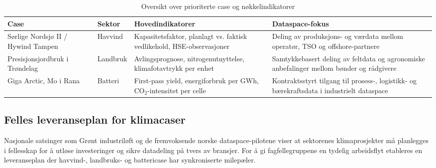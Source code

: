 \begin{table}[h]
    \centering
    \caption{Oversikt over prioriterte case og nøkkelindikatorer}
    \label{tab:prioriterte-case}
    \begin{tabular}{p{3.2cm}p{2.6cm}p{4.6cm}p{3.6cm}}
        \toprule
        Case & Sektor & Hovedindikatorer & Dataspace-fokus \\
        \midrule
        Sørlige Nordsjø II / Hywind Tampen & Havvind & Kapasitetsfaktor, planlagt vs. faktisk vedlikehold, HSE-observasjoner & Deling av produksjons- og værdata mellom operatør, TSO og offshore-partnere \\
        Presisjonsjordbruk i Trøndelag & Landbruk & Avlingsprognose, nitrogenutnyttelse, klimafotavtrykk per enhet & Samtykkebasert deling av feltdata og agronomiske anbefalinger mellom bønder og rådgivere \\
        Giga Arctic, Mo i Rana & Batteri & First-pass yield, energiforbruk per GWh, CO$_2$-intensitet per celle & Kontraktsstyrt tilgang til prosess-, logistikk- og bærekraftsdata i industrielt dataspace \\
        \bottomrule
    \end{tabular}
\end{table}

\subsection*{Felles leveranseplan for klimacaser}
Nasjonale satsinger som Grønt industriløft og de fremvoksende norske dataspace-pilotene viser at sektorenes klimaprosjekter må planlegges i fellesskap for å utløse investeringer og sikre datadeling på tvers av bransjer.\citep{regjeringen2023grontindustriloft,digitalnorway2024dataspace} For å gi fagfellegruppene en tydelig arbeidsflyt etableres en leveranseplan der havvind-, landbruks- og battericase har synkroniserte milepæler.

